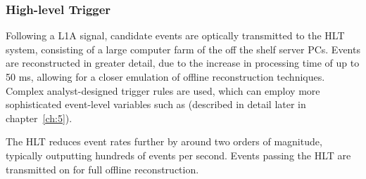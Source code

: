 \subsubsection{High-level Trigger}

Following a L1A signal, candidate events are optically transmitted to the HLT 
system, consisting of a large computer farm of the off the shelf server 
PCs. Events are reconstructed in greater detail, due to the increase in 
processing time of up to 50 ms, allowing for a closer emulation of offline 
reconstruction techniques. Complex analyst-designed trigger rules are used, 
which can employ more sophisticated event-level variables such as \alphat
(described in detail later in chapter~\ref{ch:5}).

The HLT reduces event rates further by around two orders of magnitude, typically
outputting hundreds of events per second. Events passing the HLT are transmitted
on for full offline reconstruction.
